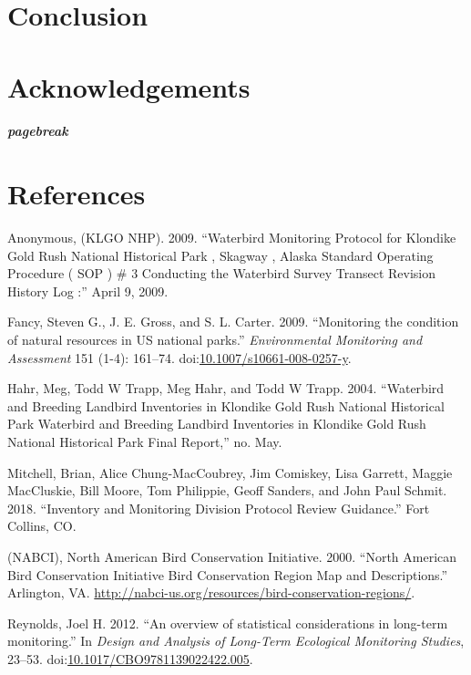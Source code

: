 \documentclass[]{article}
\let\oldsubparagraph\subparagraph
\renewcommand{\subparagraph}[1]{\oldsubparagraph{#1}\mbox{}}
\begin{document}
\section{Conclusion}\label{conclusion}

\section{Acknowledgements}\label{acknowledgements}

\subparagraph{pagebreak}\label{pagebreak}

\section{References}\label{references}

\hypertarget{refs}{}
\hypertarget{ref-Anonymous2009}{}
Anonymous, (KLGO NHP). 2009. ``Waterbird Monitoring Protocol for
Klondike Gold Rush National Historical Park , Skagway , Alaska Standard
Operating Procedure ( SOP ) \# 3 Conducting the Waterbird Survey
Transect Revision History Log :'' April 9, 2009.

\hypertarget{ref-Fancy2009}{}
Fancy, Steven G., J. E. Gross, and S. L. Carter. 2009. ``Monitoring the
condition of natural resources in US national parks.''
\emph{Environmental Monitoring and Assessment} 151 (1-4): 161--74.
doi:\href{https://doi.org/10.1007/s10661-008-0257-y}{10.1007/s10661-008-0257-y}.

\hypertarget{ref-Hahr2004}{}
Hahr, Meg, Todd W Trapp, Meg Hahr, and Todd W Trapp. 2004. ``Waterbird
and Breeding Landbird Inventories in Klondike Gold Rush National
Historical Park Waterbird and Breeding Landbird Inventories in Klondike
Gold Rush National Historical Park Final Report,'' no. May.

\hypertarget{ref-Mitchell2018}{}
Mitchell, Brian, Alice Chung-MacCoubrey, Jim Comiskey, Lisa Garrett,
Maggie MacCluskie, Bill Moore, Tom Philippie, Geoff Sanders, and John
Paul Schmit. 2018. ``Inventory and Monitoring Division Protocol Review
Guidance.'' Fort Collins, CO.

\hypertarget{ref-NABCI2000}{}
(NABCI), North American Bird Conservation Initiative. 2000. ``North
American Bird Conservation Initiative Bird Conservation Region Map and
Descriptions.'' Arlington, VA.
\url{http://nabci-us.org/resources/bird-conservation-regions/}.

\hypertarget{ref-Reynolds2012}{}
Reynolds, Joel H. 2012. ``An overview of statistical considerations in
long-term monitoring.'' In \emph{Design and Analysis of Long-Term
Ecological Monitoring Studies}, 23--53.
doi:\href{https://doi.org/10.1017/CBO9781139022422.005}{10.1017/CBO9781139022422.005}.
\end{document}
